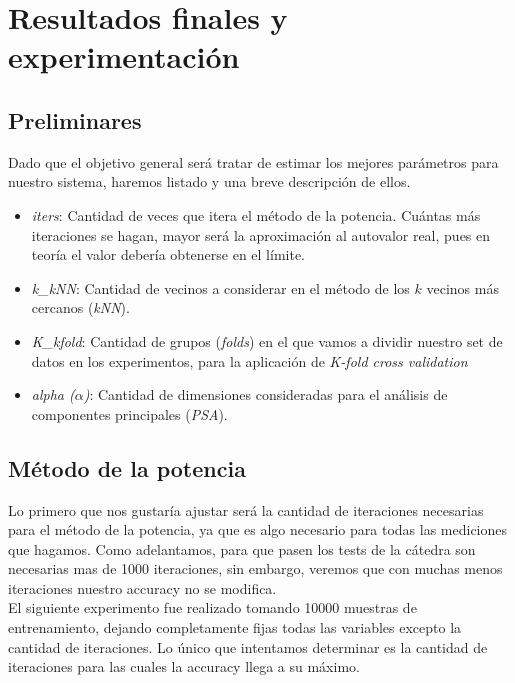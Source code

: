 \section{Resultados finales y experimentación}

\subsection{Preliminares}

Dado que el objetivo general será tratar de estimar los mejores parámetros para nuestro sistema, haremos listado y una breve descripción de ellos.

\begin{itemize}
\item \textit{iters}: Cantidad de veces que itera el método de la potencia. Cuántas más iteraciones se hagan, mayor será la aproximación al autovalor real, pues en teoría el valor debería obtenerse en el límite.

\item \textit{k\_kNN}: Cantidad de vecinos a considerar en el método de los $k$ vecinos más cercanos (\textit{kNN}).

\item \textit{K\_kfold}: Cantidad de grupos (\textit{folds}) en el que vamos a dividir nuestro set de datos en los experimentos, para la aplicación de \textit{K-fold cross validation}

\item \textit{alpha ($\alpha$)}: Cantidad de dimensiones consideradas para el análisis de componentes principales (\textit{PSA}).

\end{itemize}


\subsection{Método de la potencia}

Lo primero que nos gustaría ajustar será la cantidad de iteraciones necesarias para el método de la potencia, ya que es algo necesario para todas las mediciones que hagamos. Como adelantamos, para que pasen los tests de la cátedra son necesarias mas de 1000 iteraciones, sin embargo, veremos que con muchas menos iteraciones nuestro accuracy no se modifica. \\

El siguiente experimento fue realizado tomando 10000 muestras de entrenamiento, dejando completamente fijas todas las variables excepto la cantidad de iteraciones. Lo único que intentamos determinar es la cantidad de iteraciones para las cuales la accuracy llega a su máximo. \\

